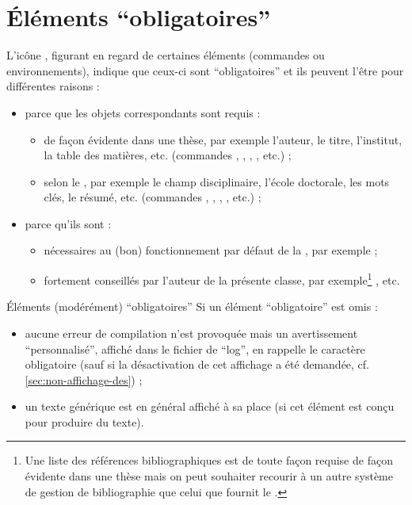 \section{Éléments \enquote{obligatoires}}
\label{sec:comm-oblig}

L'icône \mandatory{}, figurant en regard de certaines éléments (commandes ou
environnements), indique que ceux-ci sont \enquote{obligatoires} et ils peuvent
l'être pour différentes raisons :
\begin{itemize}
\item parce que les objets correspondants sont requis :
  \begin{itemize}
  \item de façon évidente dans une thèse, par exemple l'auteur, le titre,
    l'institut, la table des matières, etc. (commandes ,
    , , , etc.) ;
  \item selon le \textcite{guidoct}, par exemple le champ
    disciplinaire, l'école doctorale, les mots clés, le résumé, etc. (commandes
    , , ,
    , etc.) ;
  \end{itemize}
\item parce qu'ils sont :
  \begin{itemize}
  \item nécessaires au (bon) fonctionnement par défaut de la \yatcl{}, par
    exemple  ;
  \item fortement conseillés par l'auteur de la présente classe, par
    exemple\footnote{Une liste des références bibliographiques est de toute
      façon requise de façon évidente dans une thèse mais on peut souhaiter
      recourir à un autre système de gestion de bibliographie que celui que
      fournit le .}  , etc.
  \end{itemize}
\end{itemize}

\begin{dbremark}{Éléments (modérément) \enquote{obligatoires}}{}
  Si un élément \enquote{obligatoire} est omis :
  \begin{itemize}
  \item aucune erreur de compilation n'est provoquée mais un avertissement
    \enquote{personnalisé}, affiché dans le fichier de \enquote{log}, en
    rappelle le caractère obligatoire (sauf si la désactivation de cet
    affichage a été demandée, cf. \vref{sec:non-affichage-des}) ;
  \item un texte générique est en général affiché à sa place (si cet élément
    est conçu pour produire du texte).
  \end{itemize}
\end{dbremark}

